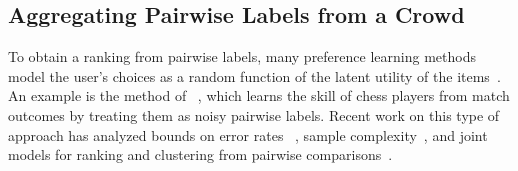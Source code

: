 \subsection{Aggregating Pairwise Labels from a Crowd} %


To obtain a ranking from pairwise labels, many preference learning methods model
the user's choices as a random function of the latent utility of the items~\citep{thurstone1927law}.
An example is the method of ~\citet{herbrich2007trueskill}, which learns the skill of chess players from 
match outcomes by treating them as noisy pairwise labels.
Recent work on this type of approach has analyzed bounds on error rates ~\citep{chen2015spectral}, 
sample complexity~\citep{shah2015estimation}, and joint models for ranking and clustering from pairwise comparisons~\citep{li2018simultaneous}.


